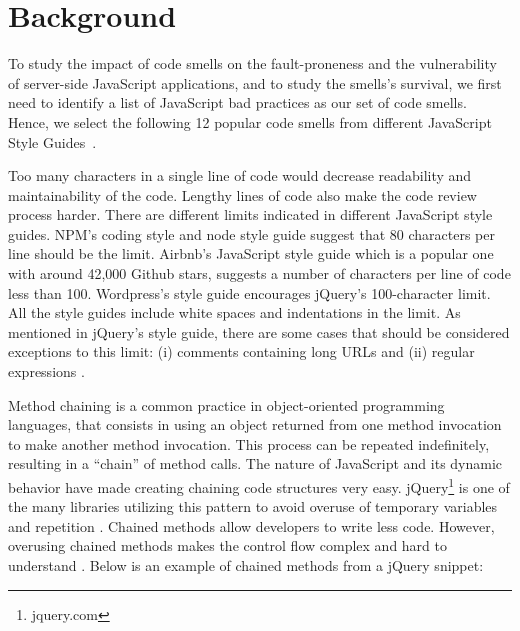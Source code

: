 \section{Background}\label{sec:background}

To study the impact of code smells on the fault-proneness {\color{blue} and the vulnerability} of server-side JavaScript applications, {\color{blue} and to study the smells's survival}, we first need to identify a list of JavaScript bad practices as our set of code smells. Hence, we select the following 12 popular code smells from different JavaScript Style Guides~\cite{fard2013jsnose, npmjss, nodejss, airbnbjss, jqueryjss, ESLint}. %

 Too many characters in a single line of code would decrease readability and maintainability of the code. Lengthy lines of code also make the code review process harder. There are different limits indicated in different JavaScript style guides. NPM's coding style\cite{npmjss} and node style guide\cite{nodejss} suggest that 80 characters per line should be the limit. Airbnb's JavaScript style guide\cite{airbnbjss} which is a popular one with around 42,000 Github stars, suggests a number of characters per line of code less than 100. Wordpress's style guide\cite{wordpressjss} encourages jQuery's 100-character limit\cite{jqueryjss}. All the style guides include white spaces and indentations in the limit. As mentioned in jQuery's style guide, there are some cases that should be considered exceptions to this limit: (i) comments containing long URLs and (ii) regular expressions \cite{jqueryjss}.

 Method chaining is a common practice in object-oriented programming languages, that consists in using an object returned from one method invocation to make another method invocation. This process can be repeated indefinitely, resulting in a ``chain'' of method calls. %
The nature of JavaScript and its dynamic behavior have made creating chaining code structures very easy. jQuery\footnote{jquery.com} is one of the many libraries utilizing this pattern to avoid overuse of temporary variables and repetition \cite{chaffer2009learning}. Chained methods allow developers to write less code. However, overusing chained methods makes the control flow complex and hard to understand \cite{fard2013jsnose}. Below is an example of chained methods from a jQuery snippet:

